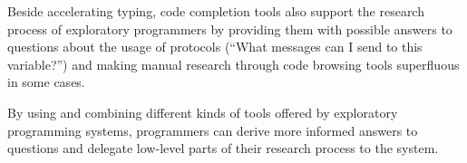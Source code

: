 	Beside accelerating typing, code completion tools also support the research process of exploratory programmers by providing them with possible answers to questions about the usage of protocols (``What messages can I send to this variable?'') and making manual research through code browsing tools superfluous in some cases.

\ParSep

By using and combining different kinds of tools offered by exploratory programming systems, programmers can derive more informed answers to questions and delegate low-level parts of their research process to the system.

